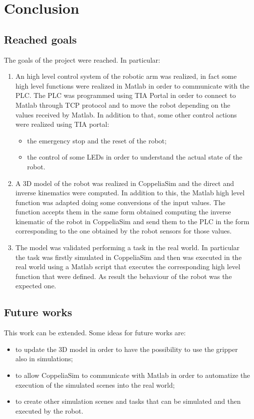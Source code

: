 \chapter{Conclusion}

\section{Reached goals}

The goals of the project were reached. In particular:
\begin{enumerate}
    \item An high level control system of the robotic arm was realized, in fact some high level functions were realized in Matlab in order to communicate with the PLC. The PLC was programmed using TIA Portal in order to connect to Matlab through TCP protocol and to move the robot depending on the values received by Matlab. In addition to that, some other control actions were realized using TIA portal:
    \begin{itemize}
        \item the emergency stop and the reset of the robot;
        \item the control of some LEDs in order to understand the actual state of the robot.
    \end{itemize} 
    \item A 3D model of the robot was realized in CoppeliaSim and the direct and inverse kinematics were computed. In addition to this, the Matlab high level function was adapted doing some conversions of the input values. The function accepts them in the same form obtained computing the inverse kinematic of the robot in CoppeliaSim and send them to the PLC in the form corresponding to the one obtained by the robot sensors for those values. 
    \item The model was validated performing a task in the real world. In particular the task was firstly simulated in CoppeliaSim and then was executed in the real world using a Matlab script that executes the corresponding high level function that were defined. As result the behaviour of the robot was the expected one.
\end{enumerate}

\section{Future works}
This work can be extended. Some ideas for future works are:
\begin{itemize}
    \item to update the 3D model in order to have the possibility to use the gripper also in simulations;
    \item to allow CoppeliaSim to communicate with Matlab in order to automatize the execution of the simulated scenes into the real world;
    \item to create other simulation scenes and tasks that can be simulated and then executed by the robot.
\end{itemize}